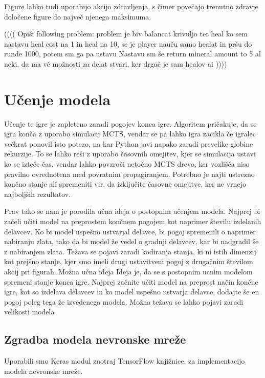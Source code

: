 \documentclass[a4paper, 12pt]{book}
\begin{document}
Figure lahko tudi uporabijo akcijo zdravljenja, s čimer povečajo trenutno zdravje določene figure do največ njenega maksimuma.

(((( Opiši following problem:
	problem je biv balancat krivuljo ter heal
	ko sem nastavu heal cost na 1 in heal na 10, se je player nauču samo healat in pršu do runde 1000, potem sm ga pa ustavu
	Nastavu sm še return mineral amount to 5 al neki, da ma vč možnosti za delat stvari, ker drgač je sam healov ai
	))))

\chapter{Učenje modela}
\label{chucenjemodela}

Učenje te igre je zapleteno zaradi pogojev konca igre. Algoritem pričakuje, da se igra konča z uporabo simulacij MCTS, vendar se pa lahko igra zacikla če igralec večkrat ponovil isto potezo, na kar Python javi napako zaradi prevelike globine rekurzije.
To se lahko reši z uporabo časovnih omejitev, kjer se simulacija ustavi ko se izteče čas, vendar lahko povzroči netočno MCTS drevo, ker vozlišča niso pravilno ovrednotena med povratnim propagiranjem.
Potrebno je najti ustrezno končno stanje ali spremeniti vir, da izključite časovne omejitve, ker ne vrnejo najboljših rezultatov.

Prav tako se nam je porodila učna ideja o postopnim učenjem modela. Najprej bi začeli učiti model na preprostem končnem pogojem kot naprimer številu izdelanih delavcev. Ko bi model uspešno ustvarjal delavce, bi pogoj spremenili o naprimer nabiranju zlata, tako da bi model že vedel o gradnji delavcev, kar bi nadgradil še z nabiranjem zlata. Težava se pojavi zaradi kodiranja stanja, ki ni istih dimenzij kot prejšno stanje, kjer smo imeli drugi ustavitveni pogoj z drugačnim številom akcij pri figurah.
Možna učna ideja
Ideja je, da se s postopnim ucnim modelom spremeni stanje konca igre. Najprej začnite učiti model na preprost način končne igre, kot so izdelava delavcev in ko model uspešno ustvarja delavce, dodajte še en pogoj poleg tega že izvedenega modela.
Možna težava se lahko pojavi zaradi velikosti modela

\section{Zgradba modela nevronske mreže}

Uporabili smo Keras modul znotraj TensorFlow knjižnice, za implementacijo modela nevronske mreže.
\end{document}
